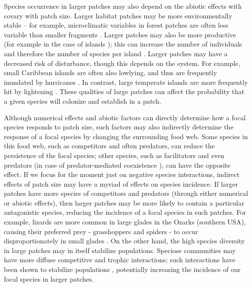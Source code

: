 Species occurrence in larger patches may also depend on the abiotic
effects with covary with patch size. Larger habitat patches may be more
environmentally stable -- for example, microclimatic variables in forest
patches are often less variable than smaller fragments
\citep{Matlack1993}. Larger patches may also be more productive (for
example in the case of islands \citep{Schoener1989}); this can increase
the number of individuals and therefore the number of species per island
\citep{Wylie1993, Kalmar2006}. Larger patches may have a decreased risk
of disturbance, though this depends on the system. For example, small
Caribbean islands are often also lowlying, and thus are frequently
inundated by hurricanes \citep{Schoener2001}. In contrast, large
temperate islands are more frequently hit by lightening
\citep{Wardle1997}. These qualities of large patches can affect the
probability that a given species will colonize and establish in a patch.

Although numerical effects and abiotic factors can directly determine
how a focal species responds to patch size, such factors may also
indirectly determine the response of a focal species by changing the
surrounding food web. Some species in this food web, such as competitors
and often predators, can reduce the persistence of the focal species;
other species, such as facilitators and even predators (in case of
predator-mediated coexistence \citep{Caswell1978}), can have the
opposite effect. If we focus for the moment just on negative species
interactions, indirect effects of patch size may have a myriad of
effects on species incidence. If larger patches have more species of
competitors and predators (through either numerical or abiotic effects),
then larger patches may be more likely to contain a particular
antagonistic species, reducing the incidence of a focal species in such
patches. For example, lizards are more common in large glades in the
Ozarks (southern USA), causing their preferred prey - grasshoppers and
spiders - to occur disproportionately in small glades
\citep{Ostman2007, Ryberg2007}. On the other hand, the high species
diversity in large patches may in itself stabilize populations. Speciose
communities may have more diffuse competitive and trophic interactions;
such interactions have been shown to stabilize populations
\citep{Aschehoug2015, Rooney2006}, potentially increasing the incidence
of our focal species in larger patches.

